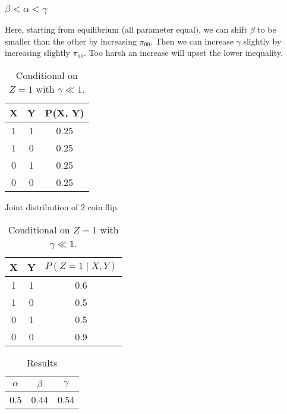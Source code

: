 \documentclass{article}
\numberwithin{equation}{section}
\begin{document}
\subsubsection{$\beta < \alpha < \gamma$}
Here, starting from equilibrium (all parameter equal), we can shift $\beta$ to 
be smaller than the other by increasing $\pi_{00}$. Then we can increase 
$\gamma$ slightly by increasing slightly $\pi_{11}$. Too harsh an 
increase will upset the lower inequality.

\begin{table}[H]
\begin{minipage}{.45\textwidth}
        \centering
        
        \begin{tabular}{|c|c|c|}
                \hline
                X & Y & P(X, Y) \\  \hline
                1 & 1 & 0.25 \\\hline 
                1 & 0 & 0.25 \\\hline 
                0 & 1 & 0.25 \\\hline 
                0 & 0 & 0.25 \\\hline
        \end{tabular}
        \caption{Joint distribution of 2 coin flip.}
\end{minipage}
\begin{minipage}{.45\textwidth}
        \centering
        \begin{tabular}{|c|c|c|}
                \hline
                X & Y & $P(Z = 1 \mid X, Y)$ \\\hline
                1 & 1 & 0.6 \\\hline
                1 & 0 & 0.5 \\\hline
                0 & 1 & 0.5 \\\hline
                0 & 0 & 0.9 \\\hline
        \end{tabular}
        \caption{Conditional on $Z = 1$ with $\gamma \ll 1$.}
\end{minipage}
        \label{tab:Joint}
\end{table}

\begin{table}[H]
        \centering
        \begin{tabular}{|c|c|c|}
                \hline 
                $\alpha$ & $\beta$ & $\gamma$ \\ \hline 
                0.5 & 0.44 & 0.54 \\\hline
        \end{tabular}
        \caption{Results}
        \label{tab:Res3}
\end{table}
\end{document}
